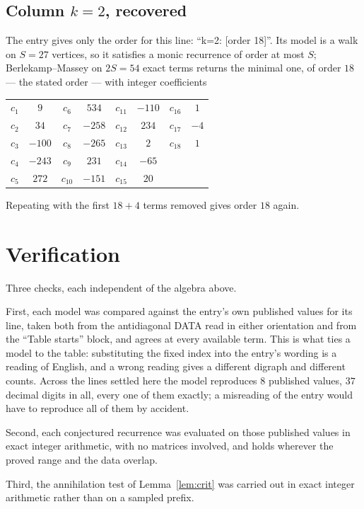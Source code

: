 \documentclass[11pt,a4paper]{article}
\theoremstyle{plain}
\theoremstyle{definition}
\begin{document}
\subsection*{Column $k=2$, recovered}
The entry gives only the order for this line: ``k=2: [order 18]''. Its model is a walk on
$S=27$ vertices, so it satisfies a monic recurrence of order at most $S$;
Berlekamp--Massey on $2S=54$ exact terms returns the minimal one, of order
$18$ --- the stated order --- with integer coefficients
\begin{center}\small\begin{tabular}{cccccccc}
$c_{1}$ & $9$ & $c_{6}$ & $534$ & $c_{11}$ & $-110$ & $c_{16}$ & $1$ \\
$c_{2}$ & $34$ & $c_{7}$ & $-258$ & $c_{12}$ & $234$ & $c_{17}$ & $-4$ \\
$c_{3}$ & $-100$ & $c_{8}$ & $-265$ & $c_{13}$ & $2$ & $c_{18}$ & $1$ \\
$c_{4}$ & $-243$ & $c_{9}$ & $231$ & $c_{14}$ & $-65$ &  &  \\
$c_{5}$ & $272$ & $c_{10}$ & $-151$ & $c_{15}$ & $20$ &  &  \\
\end{tabular}\end{center}
Repeating with the first $18+4$ terms removed gives order $18$ again.

\section{Verification}

Three checks, each independent of the algebra above.

First, each model was compared against the entry's own published values for its line, taken
both from the antidiagonal DATA read in either orientation and from the ``Table starts''
block, and agrees at every available term. This is what ties a model to the table:
substituting the fixed index into the entry's wording is a reading of English, and a wrong
reading gives a different digraph and different counts. Across the lines settled here the
model reproduces $8$ published values, $37$ decimal digits in all, every one of
them exactly; a misreading of the entry would have to reproduce all of them by accident.

Second, each conjectured recurrence was evaluated on those published values in exact
integer arithmetic, with no matrices involved, and holds wherever the proved range and the
data overlap.

Third, the annihilation test of Lemma~\ref{lem:crit} was carried out in exact integer
arithmetic rather than on a sampled prefix.
\end{document}
